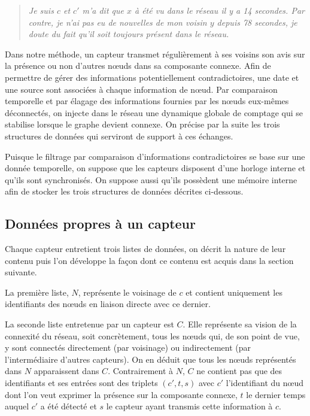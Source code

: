 \documentclass[10pt]{article}
\begin{document}
\begin{multicols}{2}
\begin{quote}
  \textit{Je suis $c$ et $c'$ m'a dit que $x$ à été vu dans le réseau
    il y a 14 secondes. Par contre, je n'ai pas eu de nouvelles de mon
    voisin $y$ depuis 78 secondes, je doute du fait qu'il soit
    toujours présent dans le réseau.}
\end{quote}

Dans notre méthode, un capteur transmet régulièrement à ses voisins
son avis sur la présence ou non d'autres n\oe uds dans sa composante
connexe. Afin de permettre de gérer des informations potentiellement
contradictoires, une date et une source sont associées à chaque
information de n\oe ud. Par comparaison temporelle et par élagage des
informations fournies par les n\oe uds eux-mêmes déconnectés, on
injecte dans le réseau une dynamique globale de comptage qui se
stabilise lorsque le graphe devient connexe. On précise par la suite
les trois structures de données qui serviront de support à ces
échanges.

Puisque le filtrage par comparaison d'informations contradictoires se
base sur une donnée temporelle, on suppose que les capteurs disposent
d'une horloge interne et qu'ils sont synchronisés. On suppose aussi
qu'ils possèdent une mémoire interne afin de stocker les trois
structures de données décrites ci-dessous.

\subsection*{Données propres à un capteur}

Chaque capteur entretient trois listes de données, on décrit la nature
de leur contenu puis l'on développe la façon dont ce contenu est
acquis dans la section suivante.

La première liste, $N$, représente le voisinage de $c$ et contient
uniquement les identifiants des n\oe uds en liaison directe avec ce
dernier.

La seconde liste entretenue par un capteur est $C$. Elle représente sa
vision de la connexité du réseau, soit concrètement, tous les n\oe uds
qui, de son point de vue, y sont connectés directement (par voisinage)
ou indirectement (par l'intermédiaire d'autres capteurs). On en déduit
que tous les n\oe uds représentés dans $N$ apparaissent dans
$C$. Contrairement à $N$, $C$ ne contient pas que des identifiants et
ses entrées sont des triplets $(c',t,s)$ avec $c'$ l'identifiant du
n\oe ud dont l'on veut exprimer la présence sur la composante connexe,
$t$ le dernier temps auquel $c'$ a été détecté et $s$ le capteur ayant
transmis cette information à $c$.


\end{multicols}
\end{document}
